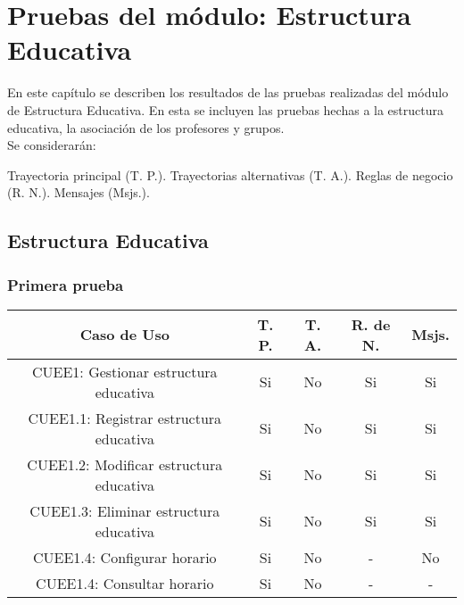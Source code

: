 \newpage

\section{Pruebas del módulo: Estructura Educativa} \label{chp:pruebasEstructuraEducativa}
	En este capítulo se describen los resultados de las pruebas realizadas del módulo de Estructura Educativa. En esta se incluyen las pruebas hechas a la estructura educativa, la asociación de los profesores y grupos. \\

	Se considerarán: \\
	\begin{Titemize}
		\Titem Trayectoria principal (T. P.).
		\Titem Trayectorias alternativas (T. A.).
		\Titem Reglas de negocio (R. N.).
		\Titem Mensajes (Msjs.).
	\end{Titemize}


\subsection{Estructura Educativa }

\subsubsection{Primera prueba}
\begin{center}
	\begin{tabular}{ |c|c|c|c|c| } 
		\hline
		Caso de Uso & T. P. & T. A. & R. de N. & Msjs. \\
		\hline 
		CUEE1: Gestionar estructura educativa & Si & No & Si & Si \\ 
		CUEE1.1: Registrar estructura educativa & Si & No & Si & Si \\ 
		CUEE1.2: Modificar estructura educativa & Si & No & Si & Si \\ 
		CUEE1.3: Eliminar estructura educativa & Si & No & Si & Si \\ 
		CUEE1.4: Configurar horario & Si & No & - & No \\  
		CUEE1.4: Consultar horario & Si & No & - & - \\  
		\hline
	\end{tabular}
\end{center}

